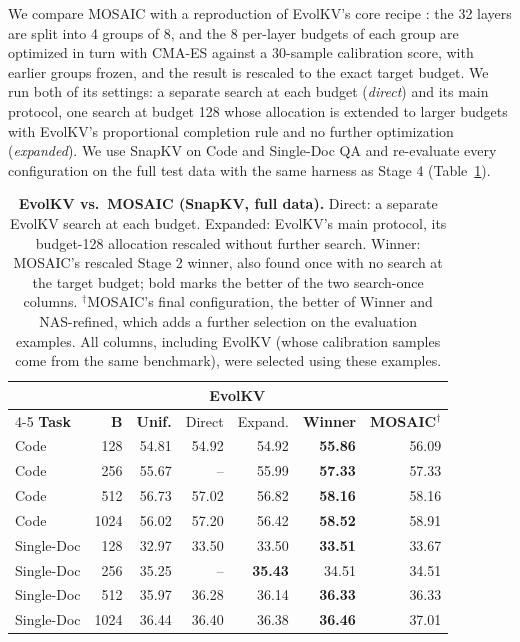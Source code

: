 \documentclass[11pt]{article}
\begin{document}
We compare MOSAIC with a reproduction of EvolKV's core recipe \citep{yu2025evolkv}: the 32 layers are split into 4 groups of 8, and the 8 per-layer budgets of each group are optimized in turn with CMA-ES against a 30-sample calibration score, with earlier groups frozen, and the result is rescaled to the exact target budget. We run both of its settings: a separate search at each budget (\emph{direct}) and its main protocol, one search at budget 128 whose allocation is extended to larger budgets with EvolKV's proportional completion rule and no further optimization (\emph{expanded}). We use SnapKV on Code and Single-Doc QA and re-evaluate every configuration on the full test data with the same harness as Stage 4 (Table~\ref{tab:ablation}).

\begin{table}[t]
  \centering
  \footnotesize
  \setlength{\tabcolsep}{1.5pt}
  \begin{tabular}{@{} l r r r r r r @{}}
    \toprule
    & & & \multicolumn{2}{c}{\textbf{EvolKV}} & & \\
    \cmidrule(lr){4-5}
    \textbf{Task} & \textbf{B} & \textbf{Unif.} & Direct & Expand. & \textbf{Winner} & \textbf{MOSAIC}$^\dagger$ \\
    \midrule
    \rowcolor{gray!10}
    Code       & 128  & 54.81 & 54.92 & 54.92 & \textbf{55.86} & 56.09 \\
    Code       & 256  & 55.67 & --    & 55.99 & \textbf{57.33} & 57.33 \\
    \rowcolor{gray!10}
    Code       & 512  & 56.73 & 57.02 & 56.82 & \textbf{58.16} & 58.16 \\
    Code       & 1024 & 56.02 & 57.20 & 56.42 & \textbf{58.52} & 58.91 \\
    \rowcolor{gray!10}
    Single-Doc & 128  & 32.97 & 33.50 & 33.50 & \textbf{33.51} & 33.67 \\
    Single-Doc & 256  & 35.25 & --    & \textbf{35.43} & 34.51 & 34.51 \\
    \rowcolor{gray!10}
    Single-Doc & 512  & 35.97 & 36.28 & 36.14 & \textbf{36.33} & 36.33 \\
    Single-Doc & 1024 & 36.44 & 36.40 & 36.38 & \textbf{36.46} & 37.01 \\
    \bottomrule
  \end{tabular}
  \caption{\textbf{EvolKV vs.\ MOSAIC (SnapKV, full data).} Direct: a separate EvolKV search at each budget. Expanded: EvolKV's main protocol, its budget-128 allocation rescaled without further search. Winner: MOSAIC's rescaled Stage 2 winner, also found once with no search at the target budget; bold marks the better of the two search-once columns. $^\dagger$MOSAIC's final configuration, the better of Winner and NAS-refined, which adds a further selection on the evaluation examples. All columns, including EvolKV (whose calibration samples come from the same benchmark), were selected using these examples.}
  \label{tab:ablation}
\end{table}
\end{document}
